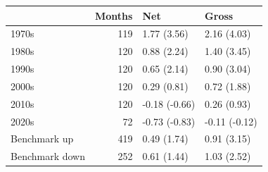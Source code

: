 \begin{tabular}{lrll}
\toprule
 & Months & Net & Gross \\
\midrule
1970s & 119 & 1.77 (3.56) & 2.16 (4.03) \\
1980s & 120 & 0.88 (2.24) & 1.40 (3.45) \\
1990s & 120 & 0.65 (2.14) & 0.90 (3.04) \\
2000s & 120 & 0.29 (0.81) & 0.72 (1.88) \\
2010s & 120 & -0.18 (-0.66) & 0.26 (0.93) \\
2020s & 72 & -0.73 (-0.83) & -0.11 (-0.12) \\
Benchmark up & 419 & 0.49 (1.74) & 0.91 (3.15) \\
Benchmark down & 252 & 0.61 (1.44) & 1.03 (2.52) \\
\bottomrule
\end{tabular}
